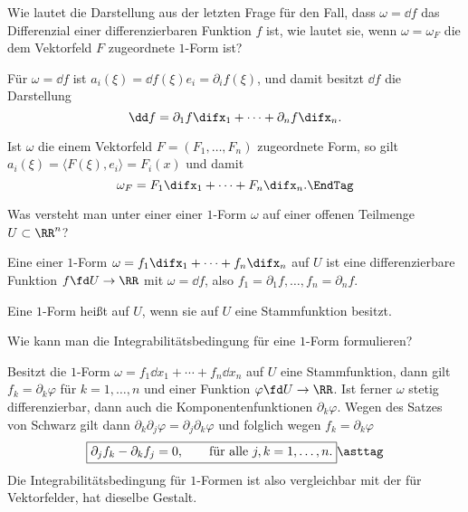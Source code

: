 \begin{frage}
  Wie lautet die Darstellung aus der letzten Frage für den Fall, dass 
  $\omega=\dd f$ das Differenzial einer 
  differenzierbaren Funktion $f$ ist, wie lautet sie, 
  wenn $\omega=\omega_F$ die dem Vektorfeld $F$ zugeordnete $1$-Form ist? 
\end{frage}

\begin{antwort}
  Für $\omega=\dd f$ ist $a_i(\xi)=\dd f(\xi) e_i=\partial_i f(\xi)$, 
  und damit besitzt $\dd f$ die Darstellung
  \[
  \dd f = \partial_1 f \difx_1 + \cdots +\partial_n f \difx_n.
  \]

  Ist $\omega$ die einem Vektorfeld $F=(F_1,\ldots,F_n)$ zugeordnete 
  Form, so gilt $a_i(\xi)=\langle F(\xi), e_i \rangle =F_i(x)$ und 
  damit 
  \[
  \omega_F = F_1 \difx_1 + \cdots + F_n \difx_n.
  \EndTag
  \]
  
\end{antwort}

\begin{frage}
  Was versteht man unter einer  einer 
  $1$-Form $\omega$ auf einer offenen Teilmenge $U\subset\RR^n$?
\end{frage}

\begin{antwort}
  Eine  einer 
  $1$-Form $\omega = f_1 \difx_1 + \cdots + f_n \difx_n$ auf $U$ ist eine 
  differenzierbare Funktion $f\fd U\to\RR$ mit 
  $\omega = \dd f$, also $f_1 = \partial_1 f, \ldots, f_n=\partial_n f$. 

  Eine $1$-Form heißt  auf $U$, wenn sie auf $U$ eine 
  Stammfunktion besitzt. \AntEnd
\end{antwort} 



\begin{frage}
  Wie kann man die Integrabilitätsbedingung für eine $1$-Form formulieren?
\end{frage}

\begin{antwort}
  Besitzt die $1$-Form $\omega= f_1 \dd x_1 +\cdots+ f_n\dd x_n$ auf $U$ eine 
  Stammfunktion, dann gilt $f_k= \partial_k \varphi$ für $k=1,\ldots,n$ 
  und einer Funktion $\varphi\fd U\to\RR$. Ist ferner $\omega$ stetig 
  differenzierbar, dann auch die Komponentenfunktionen $\partial_k \varphi$. 
  Wegen des Satzes von Schwarz gilt dann 
  $\partial_k \partial_j \varphi=\partial_j\partial_k \varphi$ 
  und folglich wegen $f_k = \partial_k\varphi$
  \[
  \boxed{ \partial_j f_k - \partial_k f_j = 0, 
    \qquad\text{für alle $j,k=1,\ldots,n$.}}\asttag
  \]  
  Die Integrabilitätsbedingung für $1$-Formen ist also vergleichbar mit 
  der für Vektorfelder, hat dieselbe Gestalt.\AntEnd 
\end{antwort} 

